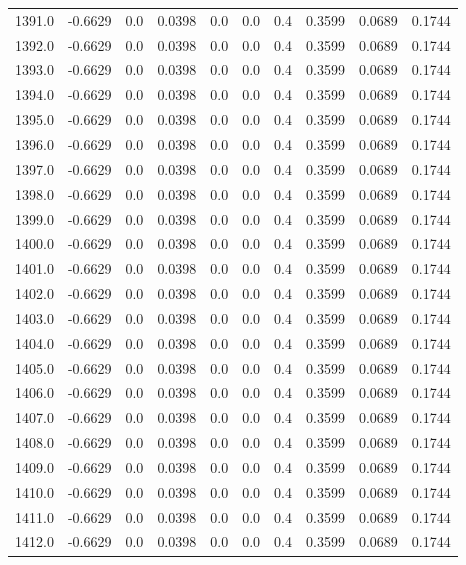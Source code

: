\begin{longtable}{lrrrrrrrrr}
1391.0 & -0.6629 & 0.0 & 0.0398 & 0.0 & 0.0 & 0.4 & 0.3599 & 0.0689 & 0.1744 \\
1392.0 & -0.6629 & 0.0 & 0.0398 & 0.0 & 0.0 & 0.4 & 0.3599 & 0.0689 & 0.1744 \\
1393.0 & -0.6629 & 0.0 & 0.0398 & 0.0 & 0.0 & 0.4 & 0.3599 & 0.0689 & 0.1744 \\
1394.0 & -0.6629 & 0.0 & 0.0398 & 0.0 & 0.0 & 0.4 & 0.3599 & 0.0689 & 0.1744 \\
1395.0 & -0.6629 & 0.0 & 0.0398 & 0.0 & 0.0 & 0.4 & 0.3599 & 0.0689 & 0.1744 \\
1396.0 & -0.6629 & 0.0 & 0.0398 & 0.0 & 0.0 & 0.4 & 0.3599 & 0.0689 & 0.1744 \\
1397.0 & -0.6629 & 0.0 & 0.0398 & 0.0 & 0.0 & 0.4 & 0.3599 & 0.0689 & 0.1744 \\
1398.0 & -0.6629 & 0.0 & 0.0398 & 0.0 & 0.0 & 0.4 & 0.3599 & 0.0689 & 0.1744 \\
1399.0 & -0.6629 & 0.0 & 0.0398 & 0.0 & 0.0 & 0.4 & 0.3599 & 0.0689 & 0.1744 \\
1400.0 & -0.6629 & 0.0 & 0.0398 & 0.0 & 0.0 & 0.4 & 0.3599 & 0.0689 & 0.1744 \\
1401.0 & -0.6629 & 0.0 & 0.0398 & 0.0 & 0.0 & 0.4 & 0.3599 & 0.0689 & 0.1744 \\
1402.0 & -0.6629 & 0.0 & 0.0398 & 0.0 & 0.0 & 0.4 & 0.3599 & 0.0689 & 0.1744 \\
1403.0 & -0.6629 & 0.0 & 0.0398 & 0.0 & 0.0 & 0.4 & 0.3599 & 0.0689 & 0.1744 \\
1404.0 & -0.6629 & 0.0 & 0.0398 & 0.0 & 0.0 & 0.4 & 0.3599 & 0.0689 & 0.1744 \\
1405.0 & -0.6629 & 0.0 & 0.0398 & 0.0 & 0.0 & 0.4 & 0.3599 & 0.0689 & 0.1744 \\
1406.0 & -0.6629 & 0.0 & 0.0398 & 0.0 & 0.0 & 0.4 & 0.3599 & 0.0689 & 0.1744 \\
1407.0 & -0.6629 & 0.0 & 0.0398 & 0.0 & 0.0 & 0.4 & 0.3599 & 0.0689 & 0.1744 \\
1408.0 & -0.6629 & 0.0 & 0.0398 & 0.0 & 0.0 & 0.4 & 0.3599 & 0.0689 & 0.1744 \\
1409.0 & -0.6629 & 0.0 & 0.0398 & 0.0 & 0.0 & 0.4 & 0.3599 & 0.0689 & 0.1744 \\
1410.0 & -0.6629 & 0.0 & 0.0398 & 0.0 & 0.0 & 0.4 & 0.3599 & 0.0689 & 0.1744 \\
1411.0 & -0.6629 & 0.0 & 0.0398 & 0.0 & 0.0 & 0.4 & 0.3599 & 0.0689 & 0.1744 \\
1412.0 & -0.6629 & 0.0 & 0.0398 & 0.0 & 0.0 & 0.4 & 0.3599 & 0.0689 & 0.1744 \\

\end{longtable}
